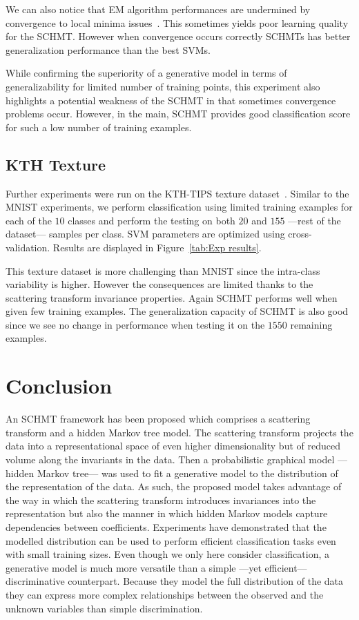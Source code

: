 \documentclass{article}
\begin{document}
		We can also notice that EM algorithm performances are undermined by convergence to local minima issues~\cite{moon1996expectation}. This sometimes yields poor learning quality for the SCHMT. However when
    convergence occurs correctly SCHMTs has better generalization performance than the best SVMs.
    
    While confirming the superiority of a generative model in terms of generalizability for limited number of training points, this experiment also highlights a
    potential weakness of the SCHMT in that sometimes convergence problems occur. However, in the main, SCHMT provides good classification score for such a low number of training examples.
		
	\vspace{-5pt}
	\subsection{KTH Texture}
		\label{subsec:Exps/KTH Texture}
		\vspace{-5pt}
		Further experiments were run on the KTH-TIPS texture dataset~\cite{KTH2016web}. Similar to the MNIST experiments, we perform classification using limited training examples for each of the $10$ classes and perform the testing on both $20$ and $155$ ---\ie rest of the dataset--- samples per class. SVM parameters are optimized using cross-validation. Results are displayed in Figure~\ref{tab:Exp results}.
    
    This texture dataset is more challenging than MNIST since the intra-class variability is higher. However the consequences are limited thanks to the scattering transform invariance properties. Again SCHMT performs well when given few training examples. The generalization capacity of SCHMT is also good since we see no change in performance when testing it on the $1550$ remaining examples. 

\section{Conclusion}
  \label{sec:Conclusion}
  \vspace{-5pt}
  An SCHMT framework has been proposed which comprises a scattering transform and a hidden Markov tree model.  The scattering transform projects the data into a representational space of even higher dimensionality but of reduced volume along the invariants in the data. Then a probabilistic graphical model ---hidden Markov tree--- was used to fit a generative model to the distribution of the representation of the data.  As such, the proposed model takes advantage of the way in which the scattering transform introduces invariances into the representation but also the manner in which hidden Markov models capture dependencies between coefficients.  Experiments have demonstrated that the modelled distribution can be used to perform efficient classification tasks even with small training sizes. Even though we only here consider classification, a generative model is much more versatile than a simple ---yet efficient--- discriminative counterpart. Because they model the full distribution of the data they can express more complex relationships between the observed and the unknown variables than simple discrimination. 
  
\end{document}
